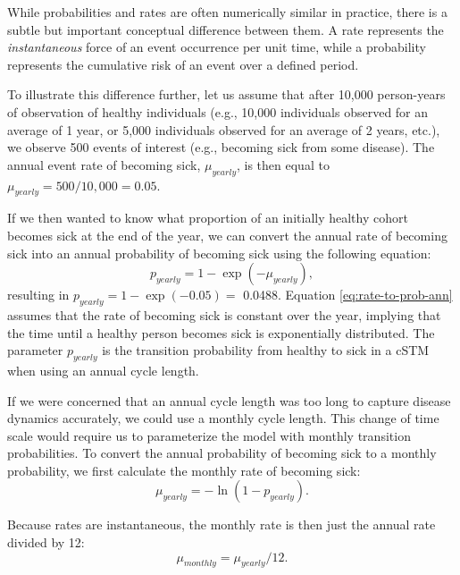 \documentclass[
]{article}
\begin{document}
While probabilities and rates are often numerically similar in practice, there is a subtle but important conceptual difference between them. A rate represents the \textit{instantaneous} force of an event occurrence per unit time, while a probability represents the cumulative risk of an event over a defined period.

To illustrate this difference further, let us assume that after 10,000 person-years of observation of healthy individuals (e.g., 10,000 individuals observed for an average of 1 year, or 5,000 individuals observed for an average of 2 years, etc.), we observe 500 events of interest (e.g., becoming sick from some disease). The annual event rate of becoming sick, \(\mu_{yearly}\), is then equal to \(\mu_{yearly}=500 / 10,000=0.05\).

If we then wanted to know what proportion of an initially healthy cohort becomes sick at the end of the year, we can convert the annual rate of becoming sick into an annual probability of becoming sick using the following equation:
\begin{equation}
    p_{yearly} = 1-\exp{\left(-\mu_{yearly} \right)},
    \label{eq:rate-to-prob-ann}
\end{equation}
resulting in \(p_{yearly} = 1-\exp{(-0.05)}=\) 0.0488. Equation \eqref{eq:rate-to-prob-ann} assumes that the rate of becoming sick is constant over the year, implying that the time until a healthy person becomes sick is exponentially distributed. The parameter \(p_{yearly}\) is the transition probability from healthy to sick in a cSTM when using an annual cycle length.

If we were concerned that an annual cycle length was too long to capture disease dynamics accurately, we could use a monthly cycle length. This change of time scale would require us to parameterize the model with monthly transition probabilities. To convert the annual probability of becoming sick to a monthly probability, we first calculate the monthly rate of becoming sick:
\begin{equation}
    \mu_{yearly} = -\ln{\left(1-p_{yearly}\right)}.
    \label{eq:prob-to-rate-ann}
\end{equation}

Because rates are instantaneous, the monthly rate is then just the annual rate divided by 12:
\begin{equation}
    \mu_{monthly} = \mu_{yearly} / 12.
    \label{eq:rate-ann-to-month}
\end{equation}
\end{document}
